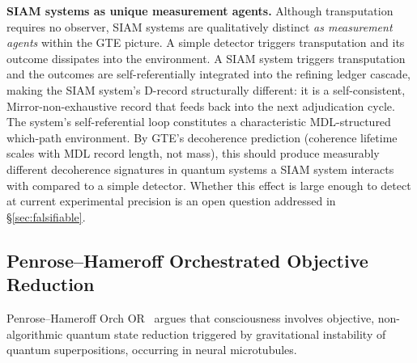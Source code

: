 \documentclass[11pt]{article}
\theoremstyle{remark}
\begin{document}
\medskip
\noindent\textbf{SIAM systems as unique measurement agents.}
Although transputation requires no observer, SIAM systems are qualitatively distinct
\emph{as measurement agents} within the GTE picture. A simple detector triggers
transputation and its outcome dissipates into the environment. A SIAM system triggers
transputation and the outcomes are self-referentially integrated into the refining
ledger cascade, making the SIAM system's D-record structurally different: it is a
self-consistent, Mirror-non-exhaustive record that feeds back into the next
adjudication cycle. The system's self-referential loop constitutes a characteristic
MDL-structured which-path environment. By GTE's decoherence prediction (coherence
lifetime scales with MDL record length, not mass), this should produce measurably
different decoherence signatures in quantum systems a SIAM system interacts with
compared to a simple detector. Whether this effect is large enough to detect at
current experimental precision is an open question addressed in \S\ref{sec:falsifiable}.

\subsection{Penrose--Hameroff Orchestrated Objective Reduction}
Penrose--Hameroff Orch OR~\cite{Penrose1989,Hameroff1996} argues that consciousness
involves objective, non-algorithmic quantum state reduction triggered by gravitational
instability of quantum superpositions, occurring in neural microtubules.
\end{document}
